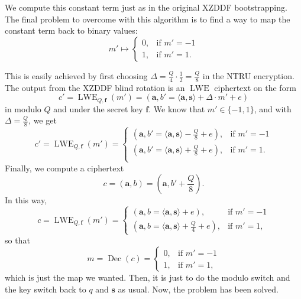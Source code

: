We compute this constant term just as in the original XZDDF bootstrapping. The final problem to overcome with this algorithm is to find a way to map the constant term back to binary values:
\begin{equation*}
    m' \mapsto
    \begin{cases}
      0, & \text{if $m' = -1$} \\
      1, & \text{if $m' = 1$}.
    \end{cases}
\end{equation*}

This is easily achieved by first choosing $\Delta = \frac{Q}{4} \cdot \frac{1}{2} = \frac{Q}{8}$ in the NTRU encryption. The output from the XZDDF blind rotation is an  $\operatorname{LWE}$ ciphertext on the form
$$c' = \operatorname{LWE}_{Q,\mathbf{f}}(m') = (\mathbf{a}, b' = \langle \mathbf{a}, \mathbf{s} \rangle + \Delta \cdot m' + e)$$
in modulo $Q$ and under the secret key $\mathbf{f}$. We know that $m' \in \{-1,1\}$, and with $\Delta = \frac{Q}{8}$, we get
\begin{equation*}
    c' = \operatorname{LWE}_{Q,\mathbf{f}}(m') =
    \begin{cases}
      (\mathbf{a}, b' = \langle \mathbf{a}, \mathbf{s} \rangle - \frac{Q}{8} + e), & \text{if $m' = -1$} \\
      (\mathbf{a}, b' = \langle \mathbf{a}, \mathbf{s} \rangle + \frac{Q}{8} + e), & \text{if $m' = 1$}. \\
    \end{cases}
\end{equation*}
Finally, we compute a ciphertext
$$c = (\mathbf{a},b) = \left(\mathbf{a},b' + \frac{Q}{8}\right).$$
In this way,
\begin{equation*}
    c = \operatorname{LWE}_{Q,\mathbf{f}}(m') =
    \begin{cases}
      (\mathbf{a}, b = \langle \mathbf{a}, \mathbf{s} \rangle + e), & \text{if $m' = -1$} \\
      (\mathbf{a}, b = \langle \mathbf{a}, \mathbf{s} \rangle + \frac{Q}{4} + e), & \text{if $m' = 1$},
    \end{cases}
\end{equation*}
so that
\begin{equation*}
    m = \operatorname{Dec}(c) =
    \begin{cases}
      0, & \text{if $m' = -1$} \\
      1, & \text{if $m' = 1$},
    \end{cases}
\end{equation*}
which is just the map we wanted. Then, it is just to do the modulo switch and the key switch back to $q$ and $\mathbf{s}$ as usual. Now, the problem has been solved.

